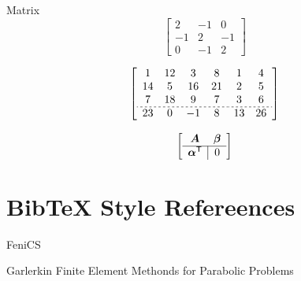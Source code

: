 \documentclass[a4paper, 12pt]{article}
\begin{document}
Matrix
\[
    \begin{bmatrix}
        2 & -1 & 0\\
        -1& 2  &-1\\
        0 & -1 & 2
    \end{bmatrix}
\]

\[
    \left[
      \begin{array}{c;{2pt/2pt}c}
        \begin{matrix}
            1 & 12 & 3 & 8 \\
            14 & 5 & 16 &21\\
            7 & 18 & 9 &7 \\ \hdashline[2pt/2pt]
            23 & 0 & -1 &8\\
        \end{matrix} &
                       \begin{matrix}
                           1 & 4 \\
                           2 & 5 \\
                           3 & 6 \\ \hdashline[2pt/2pt]
                           13 & 26 \\
                       \end{matrix}
      \end{array}
    \right]
\]

\[
    \begin{bmatrix}
        \begin{array}{c | c}
          \boldsymbol{A}  &  \bm{\beta}  \\  \hline
          \bm{\alpha}^{\mathsf T}   &  0
        \end{array}
    \end{bmatrix}
\]

\clearpage
\section{BibTeX Style Refereences}

FeniCS \cite{fenics}

Garlerkin Finite Element Methonds for Parabolic Problems \cite{thomee}

\clearpage

 

\clearpage
\end{document}
